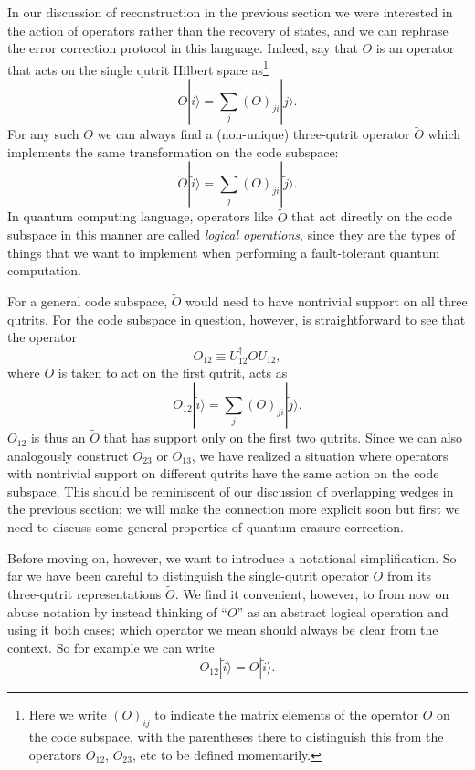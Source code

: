 \documentclass[11pt]{article}
\newcommand{\be}{\begin{equation}}
\newcommand{\ee}{\end{equation}}
\newcommand{\ran}{\rangle}
\newcommand{\wt}{\widetilde}
\begin{document}
In our discussion of reconstruction in the previous section we were interested in the action of operators rather than the recovery of states, and we can rephrase the error correction protocol in this language.  Indeed, say that $O$ is an operator that acts on the single qutrit Hilbert space as\footnote{Here we write $(O)_{ij}$ to indicate the matrix elements of the operator $O$ on the code subspace, with the parentheses there to distinguish this from the operators $O_{12}$, $O_{23}$, etc to be defined momentarily.} 
\be\label{Odef}
O|i\ran=\sum_{j}(O)_{ji}|j\ran.
\ee
For any such $O$ we can always find a (non-unique) three-qutrit operator $\wt{O}$ which implements the same transformation on the code subspace:
\be
\wt{O}|\wt{i}\ran=\sum_{j}(O)_{ji}|\wt{j}\ran.
\ee
In quantum computing language, operators like $\wt{O}$ that act directly on the code subspace in this manner are called \textit{logical operations}, since they are the types of things that we want to implement when performing a fault-tolerant quantum computation. 

For a general code subspace, $\wt{O}$ would need to have nontrivial support on all three qutrits.  For the code subspace in question, however, is straightforward to see that the operator
\be
O_{12}\equiv U_{12}^\dagger O U_{12},
\ee
where $O$ is taken to act on the first qutrit, acts as
\be
O_{12}|\wt{i}\ran=\sum_j (O)_{ji}|\wt{j}\ran.
\ee
$O_{12}$ is thus an $\wt{O}$ that has support only on the first two qutrits.  Since we can also analogously construct $O_{23}$ or $O_{13}$, we have realized a situation where operators with nontrivial support on different qutrits have the same action on the code subspace.  This should be reminiscent of our discussion of overlapping wedges in the previous section; we will make the connection more explicit soon but first we need to discuss some general properties of quantum erasure correction.

Before moving on, however, we want to introduce a notational simplification.  So far we have been careful to distinguish the single-qutrit operator $O$ from its three-qutrit representations $\wt{O}$.  We find it convenient, however, to from now on abuse notation by instead thinking of ``$O$'' as an abstract logical operation and using it both cases; which operator we mean should always be clear from the context.  So for example we can write
\be
O_{12}|\wt{i}\ran=O|\wt{i}\ran.
\ee
\end{document}
